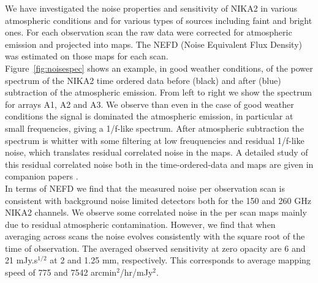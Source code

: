 \documentclass[]{aa} %
\begin{document}
We have investigated the noise properties and sensitivity of NIKA2 in various atmospheric conditions and for various types of sources including faint and bright ones. For each observation scan the raw data were corrected for atmospheric emission and projected into maps. The NEFD (Noise Equivalent Flux Density) was estimated on those maps for each scan. \\

Figure~\ref{fig:noisespec} shows an example, in good weather conditions, of the power spectrum of the NIKA2 time ordered data before (black) and after (blue) subtraction of the atmospheric emission. From left to right we show the spectrum for arrays A1, A2 and A3. 
We observe than even in the case of good weather conditions the signal is dominated the atmospheric emission, in particular at small frequencies, giving a 1/f-like spectrum. After atmospheric subtraction the spectrum is whitter with some filtering at low freuquencies and residual 1/f-like noise, which translates residual correlated noise in the maps. A detailed study of this residual correlated noise both in the time-ordered-data and maps are given in companion papers \cite{commissioning,pipeline}. \\

In terms of NEFD we find that the measured noise per observation scan is consistent with background noise limited detectors both for the 150 and 260 GHz NIKA2 channels. We observe some correlated noise in the per scan maps mainly due to residual atmospheric contamination. However, we find that when averaging across scans the noise evolves consistently with the square root of the time of observation. The averaged observed sensitivity at zero opacity are 6 and 21 mJy.s$^{1/2}$ at 2 and 1.25 mm, respectively. This corresponds to average mapping speed of 775 and 7542 arcmin$^2$/hr/mJy$^2$. 
\end{document}

